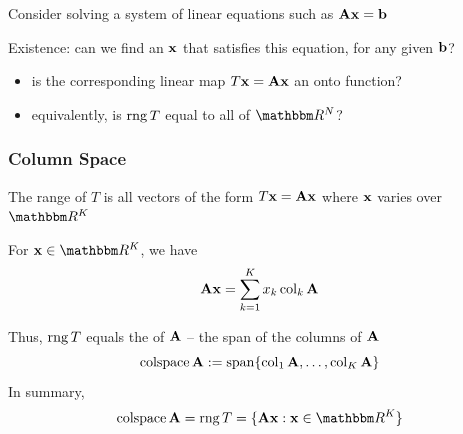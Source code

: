 \begin{frame}
    
    \vspace{2em}
    Consider solving a system of linear equations such as
    $\mathbf A {\mathbf x} = {\mathbf b}$
    
    \vspace{.7em}
    Existence: can we find an ${\mathbf x}$ that satisfies this equation, for any
    given ${\mathbf b}$?  
    \begin{itemize}
        \item is the corresponding linear map $T{\mathbf x} = \mathbf A {\mathbf x}$ an onto function? 
        \item equivalently, is $\operatorname{rng} T$ equal to all of $\RR^N$?
    \end{itemize}
    
\end{frame}


\begin{frame}\frametitle{Column Space}

    \vspace{2em}
    The range of $T$ is all vectors of the form
    $T{\mathbf x} = \mathbf A {\mathbf x}$ where ${\mathbf x}$ varies over $\RR^K$
    
    For $\boldx \in \RR^K$, we have
    \[\mathbf A {\mathbf x} = \sum_{k=1}^K x_k \operatorname{col}_k \mathbf A\]
    
    \vspace{.7em}
    Thus, $\operatorname{rng} T$ equals the  of $\mathbf A$ -- the span of the columns of $\mathbf A$
    \begin{equation*}
    \label{eq:secolsp}
    \operatorname{colspace} \mathbf A := \operatorname{span} \{ \operatorname{col}_1 \mathbf A, \ldots, \operatorname{col}_K \mathbf A \}
    \end{equation*}
    In summary, 
    \begin{equation*}
        \colspace \boldA = \range T = \setntn{\boldA \boldx}{ \boldx \in \RR^K}
    \end{equation*}
    
\end{frame}


